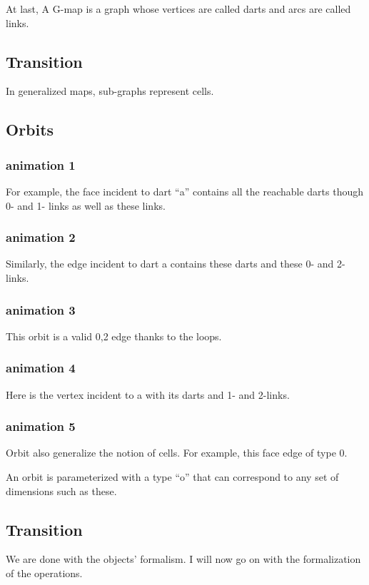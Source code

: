\documentclass[11pt]{article}
\begin{document}
At last, A G-map is a graph whose vertices are called darts and arcs are called
links.

\subsection{Transition}
\label{sec:org2806ce9}
In generalized maps, sub-graphs represent cells.

\subsection{Orbits}
\label{sec:org02cf6d7}

\subsubsection{animation 1}
\label{sec:org2977450}
For example, the face incident to dart ``a'' contains all the reachable darts
though 0- and 1- links as well as these links.
\subsubsection{animation 2}
\label{sec:org8191e83}
Similarly, the edge incident to dart a contains these darts and these 0- and
2-links.
\subsubsection{animation 3}
\label{sec:orgb3cfe8d}
This orbit is a valid 0,2 edge thanks to the loops.
\subsubsection{animation 4}
\label{sec:org3326116}
Here is the vertex incident to a with its darts and 1- and 2-links.
\subsubsection{animation 5}
\label{sec:org5cd9c84}
Orbit also generalize the notion of cells. For example, this face edge of
type 0.

An orbit is parameterized with a type ``o'' that can correspond to any set of
dimensions such as these.

\subsection{Transition}
\label{sec:org0416e58}
We are done with the objects' formalism. I will now go on with the formalization
of the operations.
\end{document}
